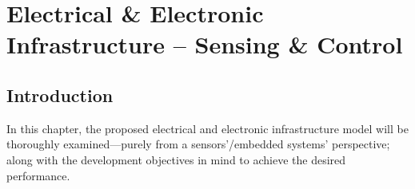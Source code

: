 



\newpage
\chapter{Electrical \& Electronic Infrastructure -- Sensing \& Control}
\section{Introduction}
In this chapter, the proposed electrical and electronic infrastructure model will be thoroughly examined---purely from a sensors'/embedded systems' perspective; along with the development objectives in mind to achieve the desired performance.




